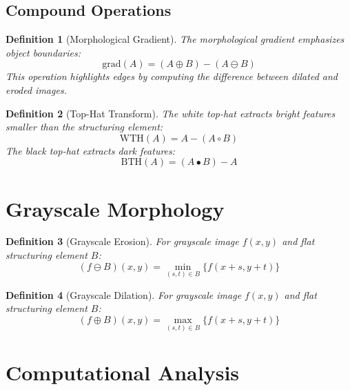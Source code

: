 \documentclass[a4paper, 11pt]{article}
\newtheorem{definition}{Definition}[section]
\begin{document}
\subsection{Compound Operations}

\begin{definition}[Morphological Gradient]
The morphological gradient emphasizes object boundaries:
\begin{equation}
\text{grad}(A) = (A \oplus B) - (A \ominus B)
\end{equation}
This operation highlights edges by computing the difference between dilated and eroded images.
\end{definition}

\begin{definition}[Top-Hat Transform]
The white top-hat extracts bright features smaller than the structuring element:
\begin{equation}
\text{WTH}(A) = A - (A \circ B)
\end{equation}
The black top-hat extracts dark features:
\begin{equation}
\text{BTH}(A) = (A \bullet B) - A
\end{equation}
\end{definition}

\section{Grayscale Morphology}

\begin{definition}[Grayscale Erosion]
For grayscale image $f(x,y)$ and flat structuring element $B$:
\begin{equation}
(f \ominus B)(x,y) = \min_{(s,t) \in B} \{f(x+s, y+t)\}
\end{equation}
\end{definition}

\begin{definition}[Grayscale Dilation]
For grayscale image $f(x,y)$ and flat structuring element $B$:
\begin{equation}
(f \oplus B)(x,y) = \max_{(s,t) \in B} \{f(x+s, y+t)\}
\end{equation}
\end{definition}

\section{Computational Analysis}
\end{document}
